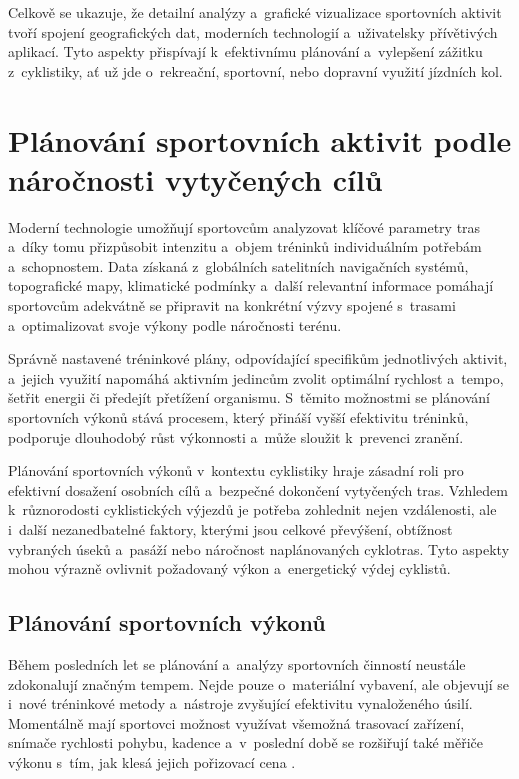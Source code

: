 Celkově se ukazuje, že detailní analýzy a~grafické vizualizace sportovních aktivit tvoří spojení geografických dat, moderních technologií a~uživatelsky přívětivých aplikací.
Tyto aspekty přispívají k~efektivnímu plánování a~vylepšení zážitku z~cyklistiky, ať už jde o~rekreační, sportovní, nebo dopravní využití jízdních kol.

\chapter{Plánování sportovních aktivit podle náročnosti vytyčených cílů}
\label{planning-of-sports-activities-according-to-the-difficulty-of-the-marked-goals}

Moderní technologie umožňují sportovcům analyzovat klíčové parametry tras a~díky tomu přizpůsobit intenzitu a~objem tréninků individuálním potřebám a~schopnostem.
Data získaná z~globálních satelitních navigačních systémů, topografické mapy, klimatické podmínky a~další relevantní informace pomáhají sportovcům adekvátně se připravit na konkrétní výzvy spojené s~trasami a~optimalizovat svoje výkony podle náročnosti terénu.

Správně nastavené tréninkové plány, odpovídající specifikům jednotlivých aktivit, a~jejich využití napomáhá aktivním jedincům zvolit optimální rychlost a~tempo, šetřit energii či předejít přetížení organismu.
S~těmito možnostmi se plánování sportovních výkonů stává procesem, který přináší vyšší efektivitu tréninků, podporuje dlouhodobý růst výkonnosti a~může sloužit k~prevenci zranění.

Plánování sportovních výkonů v~kontextu cyklistiky hraje zásadní roli pro efektivní dosažení osobních cílů a~bezpečné dokončení vytyčených tras.
Vzhledem k~různorodosti cyklistických výjezdů je potřeba zohlednit nejen vzdálenosti, ale i~další nezanedbatelné faktory, kterými jsou celkové převýšení, obtížnost vybraných úseků a~pasáží nebo náročnost naplánovaných cyklotras.
Tyto aspekty mohou výrazně ovlivnit požadovaný výkon a~energetický výdej cyklistů.

\section{Plánování sportovních výkonů}
\label{sport-performance-planning}

Během posledních let se plánování a~analýzy sportovních činností neustále zdokonalují značným tempem.
Nejde pouze o~materiální vybavení, ale objevují se i~nové tréninkové metody a~nástroje zvyšující efektivitu vynaloženého úsilí.
Momentálně mají sportovci možnost využívat všemožná trasovací zařízení, snímače rychlosti pohybu, kadence a~v~poslední době se rozšiřují také měřiče výkonu s~tím, jak klesá jejich pořizovací cena \cite{HopkerJames2012}.

